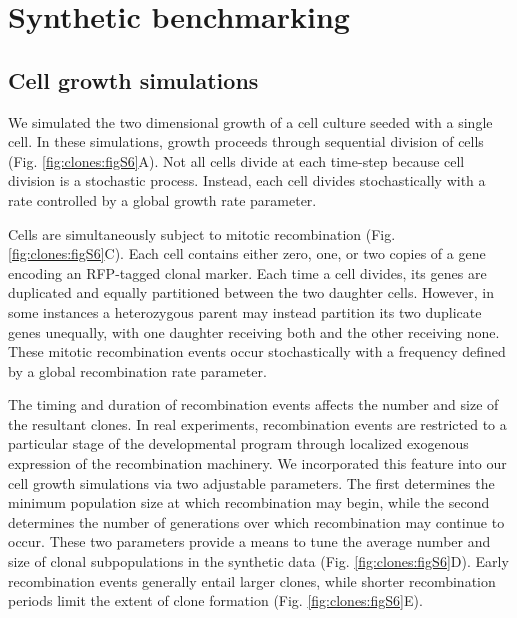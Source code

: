 \section{Synthetic benchmarking}

\subsection{Cell growth simulations}
\label{appendix:methods:clones:growth_simulation}

We simulated the two dimensional growth of a cell culture seeded with a single cell. In these simulations, growth proceeds through sequential division of cells (Fig. \ref{fig:clones:figS6}A). Not all cells divide at each time-step because cell division is a stochastic process. Instead, each cell divides stochastically with a rate controlled by a global growth rate parameter.

Cells are simultaneously subject to mitotic recombination (Fig. \ref{fig:clones:figS6}C). Each cell contains either zero, one, or two copies of a gene encoding an RFP-tagged clonal marker. Each time a cell divides, its genes are duplicated and equally partitioned between the two daughter cells. However, in some instances a heterozygous parent may instead partition its two duplicate genes unequally, with one daughter receiving both and the other receiving none. These mitotic recombination events occur stochastically with a frequency defined by a global recombination rate parameter.

The timing and duration of recombination events affects the number and size of the resultant clones. In real experiments, recombination events are restricted to a particular stage of the developmental program through localized exogenous expression of the recombination machinery. We incorporated this feature into our cell growth simulations via two adjustable parameters. The first determines the minimum population size at which recombination may begin, while the second determines the number of generations over which recombination may continue to occur. These two parameters provide a means to tune the average number and size of clonal subpopulations in the synthetic data (Fig. \ref{fig:clones:figS6}D). Early recombination events generally entail larger clones, while shorter recombination periods limit the extent of clone formation (Fig. \ref{fig:clones:figS6}E).

